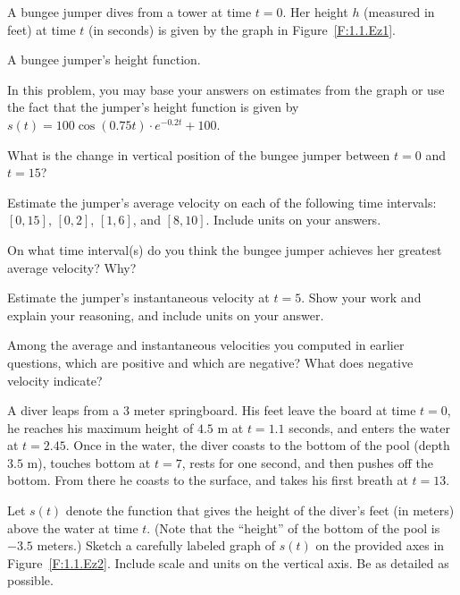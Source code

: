 \begin{exercises} 

\item \label{Ez:1.1.1} A bungee jumper dives from a tower at time $t=0$.   Her height $h$ (measured in feet) at time $t$ (in seconds) is given by the graph in Figure~\ref{F:1.1.Ez1}.

\begin{marginfigure}[.5cm]
\caption{A bungee jumper's height function.} \label{F:1.1.Ez1}
\end{marginfigure}

In this problem, you may base your answers on estimates from the graph or use the fact that the jumper's height function is given by $s(t) = 100\cos(0.75t) \cdot e^{-0.2t}+100$.
  \ba
	\item What is the change in vertical position of the bungee jumper between $t=0$ and $t=15$?
	\item Estimate the jumper's average velocity on each of the following time intervals:  $[0,15]$, $[0,2]$, $[1,6]$, and $[8,10]$.  Include units on your answers.
	\item On what time interval(s) do you think the bungee jumper achieves her greatest average velocity?  Why? 
	\item Estimate the jumper's instantaneous velocity at $t=5$.  Show your work and explain your reasoning, and include units on your answer.
	\item Among the average and instantaneous velocities you computed in earlier questions, which are positive and which are negative?  What does negative velocity indicate?
  \ea 

\begin{exerciseSolution}
\end{exerciseSolution}
\item A diver leaps from a $3$ meter springboard.  His feet leave the board at time $t=0$, he reaches his maximum height of $4.5$ m at $t = 1.1$ seconds, and enters the water at $t = 2.45$.  Once in the water, the diver coasts to the bottom of the pool (depth $3.5$ m), touches bottom at $t=7$, rests for one second, and then pushes off the bottom.  From there he coasts to the surface, and takes his first breath at $t=13$.

\ba
  \item Let $s(t)$ denote the function that gives the height of the diver's feet (in meters) above the water at time $t$.  (Note that the ``height'' of the bottom of the pool is $-3.5$ meters.)  Sketch a carefully labeled graph of $s(t)$ on the provided axes in Figure~\ref{F:1.1.Ez2}.  Include scale and units on the vertical axis.  Be as detailed as possible.


\end{exercises}
